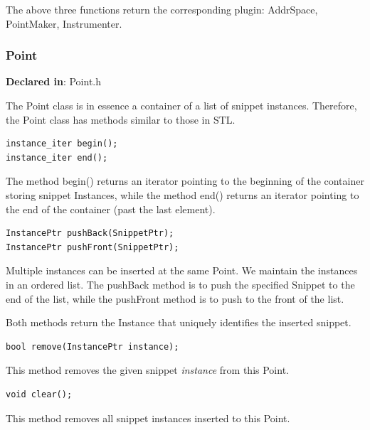 \documentclass[11pt]{article}
\begin{document}
The above three functions return the corresponding plugin: AddrSpace,
PointMaker, Instrumenter.

\subsubsection{Point}
\label{sec-3.1.2}

\textbf{Declared in}: Point.h

The Point class is in essence a container of a list of snippet
instances. Therefore, the Point class has methods similar to those in STL.


\begin{verbatim}
instance_iter begin();
instance_iter end();

\end{verbatim}



The method begin() returns an iterator pointing to the beginning of the
container storing snippet Instances, while the method end() returns an iterator
pointing to the end of the container (past the last element).


\begin{verbatim}
InstancePtr pushBack(SnippetPtr);
InstancePtr pushFront(SnippetPtr);

\end{verbatim}



Multiple instances can be inserted at the same Point. We maintain the instances
in an ordered list. The pushBack method is to push the specified Snippet to the
end of the list, while the pushFront method is to push to the front of the
list.

Both methods return the Instance that uniquely identifies the inserted snippet.


\begin{verbatim}
bool remove(InstancePtr instance);

\end{verbatim}



This method removes the given snippet \emph{instance} from this Point.


\begin{verbatim}
void clear();

\end{verbatim}



This method removes all snippet instances inserted to this Point.
\end{document}
